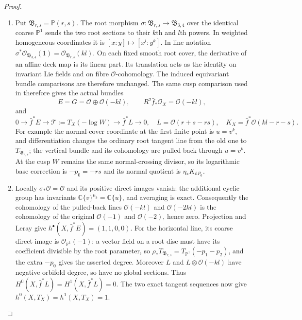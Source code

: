\begin{proof}

\begin{enumerate}[label=\arabic*.,leftmargin=*]
\item Put $\mathfrak B_{r,s}=\mathbb P(r,s)$. The root morphism
$\sigma:\mathfrak B_{r,s}\to\mathfrak B_{3,4}$ over the identical
coarse $\mathbb P^1$ sends the two root sections to their $k$th and
$l$th powers. In weighted homogeneous coordinates it is
$[x:y]\mapsto[x^l:y^k]$. In line notation
$\sigma^*\mathcal O_{\mathfrak B_{3,4}}(1)
=\mathcal O_{\mathfrak B_{r,s}}(kl)$.
On each fixed smooth root cover, the derivative of an affine
deck map is its linear part. Its translation acts as the identity
on invariant Lie fields and on fibre $\mathcal O$-cohomology.
The induced equivariant bundle comparisons are therefore unchanged. The same
cusp comparison used in  therefore gives the actual bundles
\[
 E=G=\mathcal O\oplus\mathcal O(-kl),\qquad
 R^2\bar f_*\mathcal O_X=\mathcal O(-kl),
\]
and
\[
0\to\bar f^*E\to\mathcal T:=T_X(-\log W)
 \to\bar f^*L\to0,
\quad L=\mathcal O(r+s-rs),
\quad K_X=\bar f^*\mathcal O(kl-r-s).
\]
For example the normal-cover coordinate at the first finite point
is $u=v^k$, and differentiation changes the ordinary root tangent
line from the old one to $T_{\mathfrak B_{r,s}}$; the vertical
bundle and its cohomology are pulled back through $u=v^k$.
At the cusp $W$ remains the same
normal-crossing divisor, so its logarithmic base correction is
$-p_0=-rs$ and its normal quotient is $\eta_*K_{\mathrm dP_6}$.

\item Locally $\sigma_*\mathcal O=\mathcal O$ and its positive direct
images vanish: the additional cyclic group has invariants
$\mathbb C\{v\}^{\mu_k}=\mathbb C\{u\}$, and averaging is
exact. Consequently the cohomology of the pulled-back lines
$\mathcal O(-kl)$ and $\mathcal O(-2kl)$ is the cohomology of
the original $\mathcal O(-1)$ and $\mathcal O(-2)$, hence zero.
Projection and Leray give
$h^\bullet(X,\bar f^*E)=(1,1,0,0)$.
For the horizontal line, its coarse direct image is
$\mathcal O_{\mathbb P^1}(-1)$: a vector field on a root disc
must have its coefficient divisible by the root parameter,
so $\rho_*T_{\mathfrak B_{r,s}}=T_{\mathbb P^1}(-p_1-p_2)$,
and the extra $-p_0$ gives the asserted degree. Moreover
$L$ and $L\otimes\mathcal O(-kl)$ have negative orbifold degree,
so have no global sections. Thus
$H^0(X,\bar f^*L)=H^1(X,\bar f^*L)=0$.
The two exact tangent sequences now give
$h^0(X,T_X)=h^1(X,T_X)=1$.


\end{enumerate}
\end{proof}
